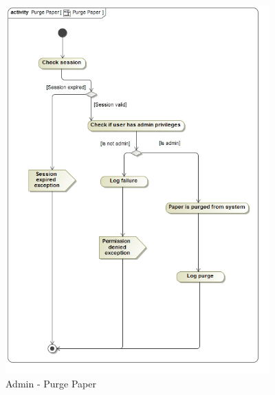 \documentclass{article}
\begin{document}
			\begin{figure}[H]
				\includegraphics[width=4in, center]{../Diagrams/Process Specifications/Publication subsystem/Purge Paper.jpg}
				\caption{Admin - Purge Paper}
			\end{figure}	
\end{document}
